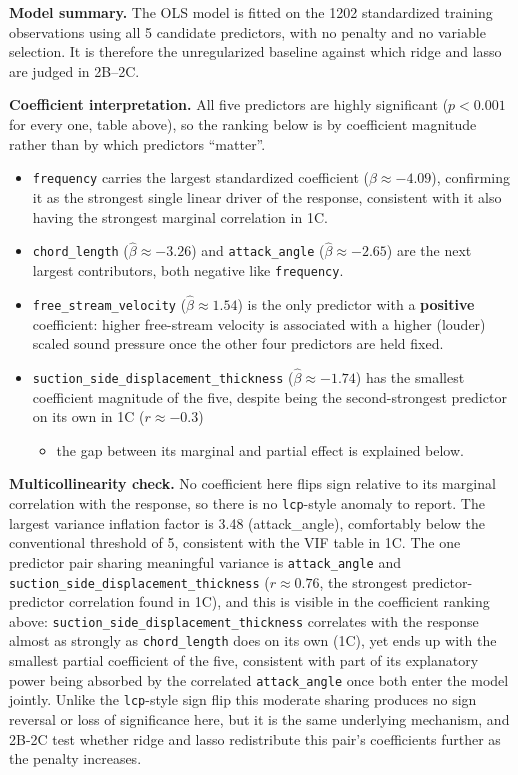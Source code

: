 \documentclass[
  11pt,
]{article}
\providecommand{\tightlist}{%
  \setlength{\itemsep}{0pt}\setlength{\parskip}{0pt}}
\begin{document}
\textbf{Model summary.} The OLS model is fitted on the 1202 standardized
training observations using all 5 candidate predictors, with no penalty
and no variable selection. It is therefore the unregularized baseline
against which ridge and lasso are judged in 2B--2C.

\textbf{Coefficient interpretation.} All five predictors are highly
significant (\(p < 0.001\) for every one, table above), so the ranking
below is by coefficient magnitude rather than by which predictors
``matter''.

\begin{itemize}
\tightlist
\item
  \texttt{frequency} carries the largest standardized coefficient
  (\(\hat{\beta} \approx -4.09\)), confirming it as the strongest single
  linear driver of the response, consistent with it also having the
  strongest marginal correlation in 1C.
\item
  \texttt{chord\_length} (\(\hat{\beta} \approx -3.26\)) and
  \texttt{attack\_angle} (\(\hat{\beta} \approx -2.65\)) are the next
  largest contributors, both negative like \texttt{frequency}.
\item
  \texttt{free\_stream\_velocity} (\(\hat{\beta} \approx 1.54\)) is the
  only predictor with a \textbf{positive} coefficient: higher
  free-stream velocity is associated with a higher (louder) scaled sound
  pressure once the other four predictors are held fixed.
\item
  \texttt{suction\_side\_displacement\_thickness}
  (\(\hat{\beta} \approx -1.74\)) has the smallest coefficient magnitude
  of the five, despite being the second-strongest predictor on its own
  in 1C (\(r \approx -0.3\))

  \begin{itemize}
  \tightlist
  \item
    the gap between its marginal and partial effect is explained below.
  \end{itemize}
\end{itemize}

\textbf{Multicollinearity check.} No coefficient here flips sign
relative to its marginal correlation with the response, so there is no
\texttt{lcp}-style anomaly to report. The largest variance inflation
factor is 3.48 (attack\_angle), comfortably below the conventional
threshold of 5, consistent with the VIF table in 1C. The one predictor
pair sharing meaningful variance is \texttt{attack\_angle} and
\texttt{suction\_side\_displacement\_thickness} (\(r \approx 0.76\), the
strongest predictor-predictor correlation found in 1C), and this is
visible in the coefficient ranking above:
\texttt{suction\_side\_displacement\_thickness} correlates with the
response almost as strongly as \texttt{chord\_length} does on its own
(1C), yet ends up with the smallest partial coefficient of the five,
consistent with part of its explanatory power being absorbed by the
correlated \texttt{attack\_angle} once both enter the model jointly.
Unlike the \texttt{lcp}-style sign flip this moderate sharing produces
no sign reversal or loss of significance here, but it is the same
underlying mechanism, and 2B-2C test whether ridge and lasso
redistribute this pair's coefficients further as the penalty increases.
\end{document}
